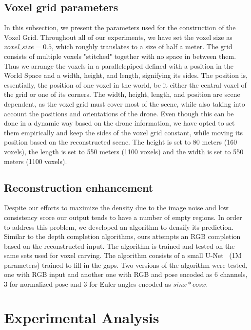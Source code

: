 \documentclass{article}
\begin{document}
\subsection{Voxel grid parameters} \label{params}
In this subsection, we present the parameters used for the construction of the Voxel Grid. Throughout all of our experiments, we have set the voxel size as \(voxel\_size=0.5\), which roughly translates to a size of half a meter. The grid consists of multiple voxels "stitched" together with no space in between them. Thus we arrange the voxels in a parallelepiped defined with a position in the World Space and a width, height, and length, signifying its sides. The position is, essentially, the position of one voxel in the world, be it either the central voxel of the grid or one of its corners. The width, height, length, and position are scene dependent, as the voxel grid must cover most of the scene, while also taking into account the positions and orientations of the drone. Even though this can be done in a dynamic way based on the drone information, we have opted to set them empirically and keep the sides of the voxel grid constant, while moving its position based on the reconstructed scene. The height is set to 80 meters (160 voxels), the length is set to 550 meters (1100 voxels) and the width is set to 550 meters (1100 voxels).

\subsection{Reconstruction enhancement}\label{sec:re}

Despite our efforts to maximize the density due to the image noise and low consistency score our output tends to have a number of empty regions. In order to address this problem, we developed an algorithm to densify its prediction. Similar to the depth completion algorithms, ours attempts an RGB completion based on the reconstructed input. The algorithm is trained and tested on the same sets used for voxel carving. The algorithm consists of a small U-Net~\cite{ronneberger2015u} (1M parameters) trained to fill in the gaps. Two versions of the algorithm were tested, one with RGB input and another one with RGB and pose encoded as 6 channels, 3 for normalized pose and 3 for Euler angles encoded as $sinx*cosx$.

\section{Experimental Analysis} %
\end{document}
